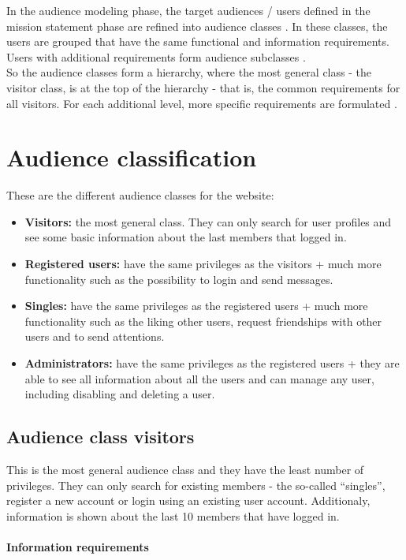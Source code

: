 \documentclass[11pt, a4paper,svglistings,oneside]{book}
\begin{document}
In the audience modeling phase, the target audiences / users defined in the mission statement phase are refined into audience classes \citep{WSDM2}. In these classes, the users are grouped that have the same functional and information requirements. Users with additional requirements form audience subclasses \citep{WSDM3}. \\
So the audience classes form a hierarchy, where the most general class - the visitor class, is at the top of the hierarchy - that is, the common requirements for all visitors. For each additional level, more specific requirements are formulated \citep{WSDM3}.

\section{Audience classification}

These are the different audience classes for the website:
\begin{itemize}
\item \textbf{Visitors:} the most general class. They can only search for user profiles and see some basic information about the last members that logged in.
\item \textbf{Registered users:} have the same privileges as the visitors + much more functionality such as the possibility to login and send messages.
\item \textbf{Singles:} have the same privileges as the registered users + much more functionality such as the liking other users, request friendships with other users and to send attentions.
\item \textbf{Administrators:} have the same privileges as the registered users + they are able to see all information about all the users and can manage any user, including disabling and deleting a user.
\end{itemize}

\subsection{Audience class visitors}
\label{sec:visitorclass}
This is the most general audience class and they have the least number of privileges. They can only search for existing members - the so-called ``singles'', register a new account or login using an existing user account. Additionaly, information is shown about the last 10 members that have logged in.

\paragraph{Information requirements}
\end{document}
